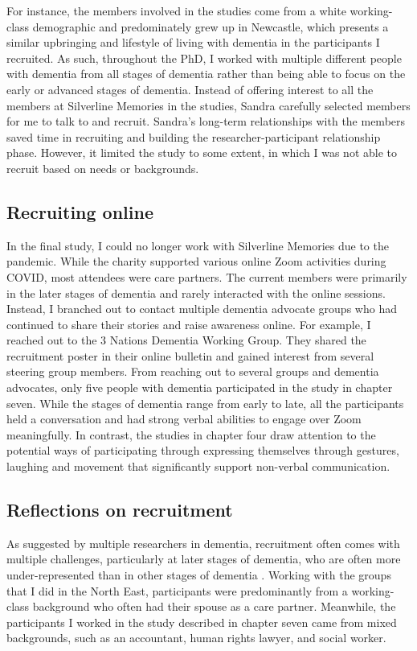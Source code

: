For instance, the members involved in the studies come from a white working-class demographic and predominately grew up in Newcastle, which presents a similar upbringing and lifestyle of living with dementia in the participants I recruited. As such, throughout the PhD, I worked with multiple different people with dementia from all stages of dementia rather than being able to focus on the early or advanced stages of dementia. Instead of offering interest to all the members at Silverline Memories in the studies, Sandra carefully selected members for me to talk to and recruit. Sandra's long-term relationships with the members saved time in recruiting and building the researcher-participant relationship phase. However,  it limited the study to some extent, in which I was not able to recruit based on needs or backgrounds.

\subsection{Recruiting online}
\label{Method:RecruitOnline}
In the final study, I could no longer work with Silverline Memories due to the pandemic. While the charity supported various online Zoom activities during COVID, most attendees were care partners. The current members were primarily in the later stages of dementia and rarely interacted with the online sessions. Instead, I branched out to contact multiple dementia advocate groups who had continued to share their stories and raise awareness online. For example, I reached out to the 3 Nations Dementia Working Group. They shared the recruitment poster in their online bulletin and gained interest from several steering group members. From reaching out to several groups and dementia advocates, only five people with dementia participated in the study in chapter seven. While the stages of dementia range from early to late, all the participants held a conversation and had strong verbal abilities to engage over Zoom meaningfully. In contrast, the studies in chapter four draw attention to the potential ways of participating through expressing themselves through gestures, laughing and movement that significantly support non-verbal communication.

\subsection{Reflections on recruitment}
As suggested by multiple researchers in dementia, recruitment often comes with multiple challenges, particularly at later stages of dementia, who are often more under-represented than in other stages of dementia \citep{bartlett2019strategies}. Working with the groups that I did in the North East, participants were predominantly from a working-class background who often had their spouse as a care partner. Meanwhile, the participants I worked in the study described in chapter seven came from mixed backgrounds, such as an accountant, human rights lawyer, and social worker. 

